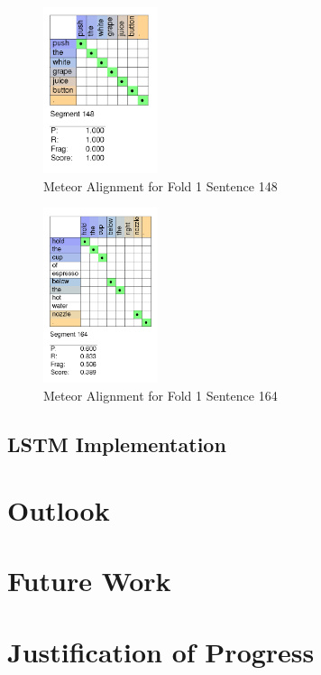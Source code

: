 \documentclass[letterpaper, 12 pt, conference]{ieeeconf}
\begin{document}
\begin{figure}[htb!]
  \centering
  \includegraphics[width=0.3\textwidth]{fold_1_sentence_148}
  \caption{Meteor Alignment for Fold 1 Sentence 148}
  \label{fig:fold_1_sentence_148}
\end{figure}

\begin{figure}[htb!]
  \centering
  \includegraphics[width=0.3\textwidth]{fold_1_sentence_164}
  \caption{Meteor Alignment for Fold 1 Sentence 164}
  \label{fig:fold_1_sentence_164}
\end{figure}

\subsection{LSTM Implementation}

\section{Outlook}

\section{Future Work}

\section{Justification of Progress}


%


\end{document}
